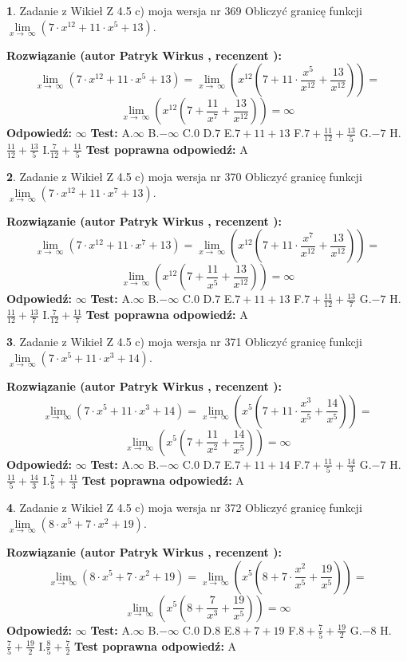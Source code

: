 \documentclass[12pt, a4paper]{article}
\theoremstyle{definition} %
\newtheorem{zad}{}
\newcommand{\zadStart}[1]{\begin{zad}#1\newline}
\newcommand{\zadStop}{\end{zad}}
\newcommand{\rozwStart}[2]{\noindent \textbf{Rozwiązanie (autor #1 , recenzent #2): }\newline}
\newcommand{\rozwStop}{\newline}
\newcommand{\odpStart}{\noindent \textbf{Odpowiedź:}\newline}
\newcommand{\odpStop}{\newline}
\newcommand{\testStart}{\noindent \textbf{Test:}\newline}
\newcommand{\testStop}{\newline}
\newcommand{\kluczStart}{\noindent \textbf{Test poprawna odpowiedź:}\newline}
\newcommand{\kluczStop}{\newline}
\begin{document}
\zadStart{Zadanie z Wikieł Z 4.5 c) moja wersja nr 369}
Obliczyć granicę funkcji  $\lim\limits_{x\to\ \infty}(7 \cdot x^{12}+11 \cdot x^{5}+13)$.
\zadStop
\rozwStart{Patryk Wirkus}{}
$$\lim\limits_{x\to\ \infty}(7 \cdot x^{12}+11 \cdot x^{5}+13) = \lim\limits_{x\to\ \infty}(x^{12}(7 +11 \cdot \frac{x^{5}}{x^{12}}+\frac{13}{x^{12}})) =$$ $$\lim\limits_{x\to\ \infty}(x^{12}(7 +\frac{11}{x^{7}}+\frac{13}{x^{12}})) =\infty$$
\rozwStop
\odpStart
$\infty$
\odpStop
\testStart
A.$\infty$ B.$-\infty$ C.$0$ D.$7$ E.$7 + 11 + 13$
F.$7+\frac{11}{12}+\frac{13}{5}$ G.$-7$
H.$\frac{11}{12}+\frac{13}{5}$
I.$\frac{7}{12}+\frac{11}{5}$
\testStop
\kluczStart
A
\kluczStop



\zadStart{Zadanie z Wikieł Z 4.5 c) moja wersja nr 370}
Obliczyć granicę funkcji  $\lim\limits_{x\to\ \infty}(7 \cdot x^{12}+11 \cdot x^{7}+13)$.
\zadStop
\rozwStart{Patryk Wirkus}{}
$$\lim\limits_{x\to\ \infty}(7 \cdot x^{12}+11 \cdot x^{7}+13) = \lim\limits_{x\to\ \infty}(x^{12}(7 +11 \cdot \frac{x^{7}}{x^{12}}+\frac{13}{x^{12}})) =$$ $$\lim\limits_{x\to\ \infty}(x^{12}(7 +\frac{11}{x^{5}}+\frac{13}{x^{12}})) =\infty$$
\rozwStop
\odpStart
$\infty$
\odpStop
\testStart
A.$\infty$ B.$-\infty$ C.$0$ D.$7$ E.$7 + 11 + 13$
F.$7+\frac{11}{12}+\frac{13}{7}$ G.$-7$
H.$\frac{11}{12}+\frac{13}{7}$
I.$\frac{7}{12}+\frac{11}{7}$
\testStop
\kluczStart
A
\kluczStop



\zadStart{Zadanie z Wikieł Z 4.5 c) moja wersja nr 371}
Obliczyć granicę funkcji  $\lim\limits_{x\to\ \infty}(7 \cdot x^{5}+11 \cdot x^{3}+14)$.
\zadStop
\rozwStart{Patryk Wirkus}{}
$$\lim\limits_{x\to\ \infty}(7 \cdot x^{5}+11 \cdot x^{3}+14) = \lim\limits_{x\to\ \infty}(x^{5}(7 +11 \cdot \frac{x^{3}}{x^{5}}+\frac{14}{x^{5}})) =$$ $$\lim\limits_{x\to\ \infty}(x^{5}(7 +\frac{11}{x^{2}}+\frac{14}{x^{5}})) =\infty$$
\rozwStop
\odpStart
$\infty$
\odpStop
\testStart
A.$\infty$ B.$-\infty$ C.$0$ D.$7$ E.$7 + 11 + 14$
F.$7+\frac{11}{5}+\frac{14}{3}$ G.$-7$
H.$\frac{11}{5}+\frac{14}{3}$
I.$\frac{7}{5}+\frac{11}{3}$
\testStop
\kluczStart
A
\kluczStop



\zadStart{Zadanie z Wikieł Z 4.5 c) moja wersja nr 372}
Obliczyć granicę funkcji  $\lim\limits_{x\to\ \infty}(8 \cdot x^{5}+7 \cdot x^{2}+19)$.
\zadStop
\rozwStart{Patryk Wirkus}{}
$$\lim\limits_{x\to\ \infty}(8 \cdot x^{5}+7 \cdot x^{2}+19) = \lim\limits_{x\to\ \infty}(x^{5}(8 +7 \cdot \frac{x^{2}}{x^{5}}+\frac{19}{x^{5}})) =$$ $$\lim\limits_{x\to\ \infty}(x^{5}(8 +\frac{7}{x^{3}}+\frac{19}{x^{5}})) =\infty$$
\rozwStop
\odpStart
$\infty$
\odpStop
\testStart
A.$\infty$ B.$-\infty$ C.$0$ D.$8$ E.$8 + 7 + 19$
F.$8+\frac{7}{5}+\frac{19}{2}$ G.$-8$
H.$\frac{7}{5}+\frac{19}{2}$
I.$\frac{8}{5}+\frac{7}{2}$
\testStop
\kluczStart
A
\kluczStop
\end{document}
